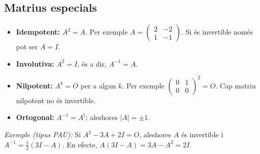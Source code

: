 \subsection{Matrius especials}

\begin{itemize}
\item \textbf{Idempotent:} $A^{2}=A$. Per exemple $A=\begin{pmatrix}2&-2\\1&-1\end{pmatrix}$. Si és invertible només pot ser $A=I$.
\item \textbf{Involutiva:} $A^{2}=I$, és a dir, $A^{-1}=A$.
\item \textbf{Nilpotent:} $A^{k}=O$ per a algun $k$. Per exemple $\begin{pmatrix}0&1\\0&0\end{pmatrix}^{2}=O$. Cap matriu nilpotent no és invertible.
\item \textbf{Ortogonal:} $A^{-1}=A^{t}$; aleshores $|A|=\pm1$.
\end{itemize}

\emph{Exemple (tipus PAU):} Si $A^{2}-3A+2I=O$, aleshores $A$ és invertible i $A^{-1}=\tfrac12(3I-A)$. En efecte, $A(3I-A)=3A-A^{2}=2I$.
